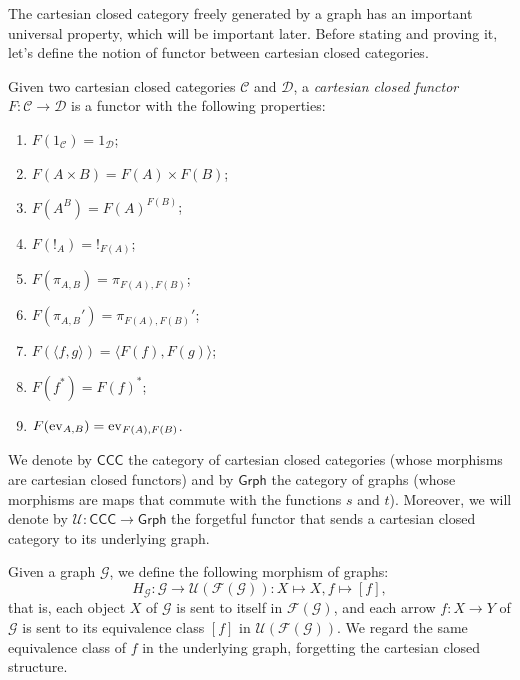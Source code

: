 The cartesian closed category freely generated by a graph has an important universal property, which will be important later.
Before stating and proving it, let's define the notion of functor between cartesian closed categories.

\begin{definition}
    Given two cartesian closed categories $\mathcal C$ and $\mathcal D$, a \emph{cartesian closed functor} $F : \mathcal C \to \mathcal D$ is a functor with the following properties:
    \begin{enumerate}[label=(\emph{\roman*})]
        \item $F(1_\mathcal C) = 1_\mathcal D$;
        \item $F(A \times B) = F(A) \times F(B)$;
        \item $F(A^B) = F(A)^{F(B)}$;
        \item $F(!_A) = !_{F(A)}$;
        \item $F(\pi_{A,B}) = \pi_{F(A),F(B)}$;
        \item $F(\pi_{A,B}') = \pi_{F(A),F(B)}'$;
        \item $F(\langle f, g \rangle) = \langle F(f), F(g)\rangle$;
        \item $F(f^*) = F(f)^*$;
        \item $F(\operatorname{ev}_{A,B}) = \operatorname{ev}_{F(A),F(B)}$.
    \end{enumerate}
\end{definition}

\begin{notation}
    We denote by $\mathsf{CCC}$ the category of cartesian closed categories (whose morphisms are cartesian closed functors) and by $\mathsf{Grph}$ the category of graphs (whose morphisms are maps that commute with the functions $s$ and $t$).
    Moreover, we will denote by $\mathcal U : \mathsf{CCC} \to \mathsf{Grph}$ the forgetful functor that sends a cartesian closed category to its underlying graph.
\end{notation}

\begin{definition}
    Given a graph $\mathcal G$, we define the following morphism of graphs:
    \[ H_\mathcal G : \mathcal G \to \mathcal U(\mathcal F(\mathcal G)) : X \mapsto X, f \mapsto [f],\]
    that is, each object $X$ of $\mathcal G$ is sent to itself in $\mathcal F(\mathcal G)$, and each arrow $f : X \to Y$ of $\mathcal G$ is sent to its equivalence class $[f]$ in $\mathcal U(\mathcal F(\mathcal G))$.
    We regard the same equivalence class of $f$ in the underlying graph, forgetting the cartesian closed structure.
\end{definition}


